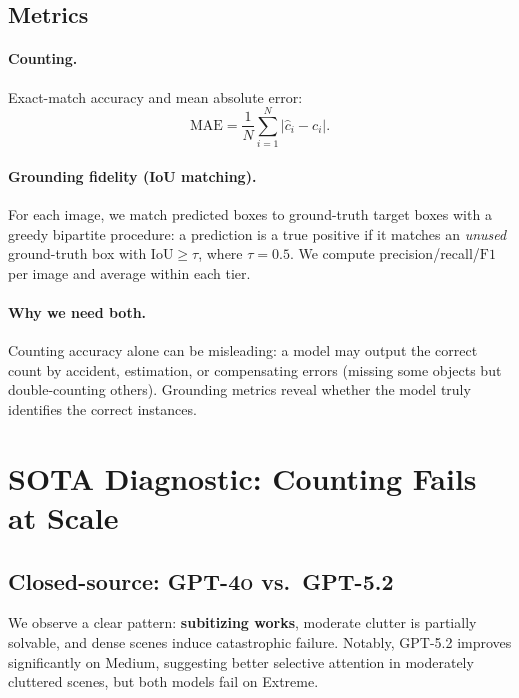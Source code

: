 \documentclass[10pt]{article}
\newcommand{\gptfour}{\textsc{GPT-4o}\xspace}
\newcommand{\gptfive}{\textsc{GPT-5.2}\xspace}
\newcommand{\iou}{\ensuremath{\mathrm{IoU}}\xspace}
\newcommand{\fOne}{\ensuremath{\mathrm{F1}}\xspace}
\newcommand{\mae}{\ensuremath{\mathrm{MAE}}\xspace}
\newcommand{\tauIoU}{0.5}
\begin{document}
\subsection{Metrics}
\paragraph{Counting.}
Exact-match accuracy and mean absolute error:
\[
\mae = \frac{1}{N}\sum_{i=1}^{N} \left| \hat{c}_i - c_i \right|.
\]

\paragraph{Grounding fidelity (IoU matching).}
For each image, we match predicted boxes to ground-truth target boxes with a greedy bipartite procedure:
a prediction is a true positive if it matches an \emph{unused} ground-truth box with $\iou \ge \tau$, where $\tau = \tauIoU$.
We compute precision/recall/\fOne per image and average within each tier.

\paragraph{Why we need both.}
Counting accuracy alone can be misleading: a model may output the correct count by accident, estimation, or compensating errors (missing some objects but double-counting others).
Grounding metrics reveal whether the model truly identifies the correct instances.

\section{SOTA Diagnostic: Counting Fails at Scale}
\subsection{Closed-source: \gptfour vs.\ \gptfive}
We observe a clear pattern:
\textbf{subitizing works}, moderate clutter is partially solvable, and dense scenes induce catastrophic failure.
Notably, \gptfive improves significantly on Medium, suggesting better selective attention in moderately cluttered scenes, but both models fail on Extreme.
\end{document}
